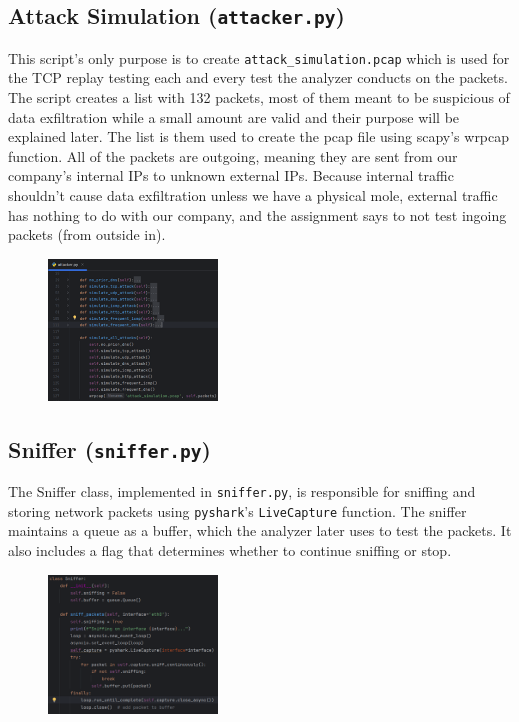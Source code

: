 \documentclass{article}
\begin{document}
\subsection{Attack Simulation (\texttt{attacker.py})}
This script’s only purpose is to create \texttt{attack\_simulation.pcap} which is used for the TCP replay testing each and every test the analyzer conducts on the packets.
The script creates a list with 132 packets, most of them meant to be suspicious of data exfiltration while a small amount are valid and their purpose will be explained later. The list is them used to create the pcap file using scapy’s wrpcap function.
All of the packets are outgoing, meaning they are sent from our company’s internal IPs to unknown external IPs. Because internal traffic shouldn’t cause data exfiltration unless we have a physical mole, external traffic has nothing to do with our company, and the assignment says to not test ingoing packets (from outside in).
\begin{figure}[H]
    \centering
    \includegraphics[width=0.4\textwidth]{attacker.png}
\end{figure} 

\newpage
\subsection{Sniffer (\texttt{sniffer.py})}
The Sniffer class, implemented in \texttt{sniffer.py}, is responsible for sniffing and storing network packets using \texttt{pyshark}'s \texttt{LiveCapture} function. The sniffer maintains a queue as a buffer, which the analyzer later uses to test the packets. It also includes a flag that determines whether to continue sniffing or stop.
\begin{figure}[H]
    \centering
    \includegraphics[width=0.4\textwidth]{sniffer.png}
\end{figure}
\end{document}
